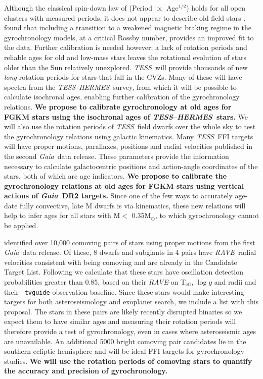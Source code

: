 \documentclass[letterpaper,12pt,preprint]{hack_aastex}
\newcommand{\TESS}{{\it TESS}}
\newcommand{\tess}{{\it TESS}}
\newcommand{\Gaia}{{\it Gaia}}
\newcommand{\RAVE}{{\it RAVE}}
\newcommand{\hermes}{{\it HERMES}}
\newcommand{\HERMES}{{\it HERMES}}
\begin{document}
Although the classical spin-down law of \citet{skumanich1972} (Period
$\propto$ Age$^{1/2}$) holds for all open clusters with measured periods, it
does not appear to describe old field stars \citep{angus2015, van-saders2016}.
\citet{van-saders2016} found that including a transition to a weakened magnetic
braking regime in the gyrochronology models, at a critical Rossby number,
provides an improved fit to the data.
Further calibration is needed however; a lack of rotation periods and reliable
ages for old and low-mass stars leaves the rotational evolution of stars older
than the Sun relatively unexplored.
\TESS\ will provide thousands of new {\it long } rotation periods for stars
that fall in the CVZs.
Many of these will have spectra from the \TESS --\HERMES\ survey, from which
it will be possible to calculate isochronal ages, enabling further calibration
of the gyrochronology relations.
{\bf We propose to calibrate gyrochronology at old ages for FGKM stars using
the isochronal ages of \TESS--\hermes\ stars.}
We will also use the rotation periods of \TESS\ field dwarfs over the whole sky
to test the gyrochronology relations using galactic kinematics.
Many \tess\ FFI targets will have proper motions, parallaxes, positions and
radial velocities published in the second \Gaia\ data release.
These parameters provide the information necessary to calculate galactocentric
positions and action-angle coordinates of the stars, both of which are age
indicators.
{\bf We propose to calibrate the gyrochronology relations at old ages for FGKM
stars using vertical actions of \Gaia\ DR2 targets.}
Since one of the few ways to accurately age-date fully convective, late M
dwarfs is via kinematics, these new relations will help to infer ages for all
stars with M$<$ 0.35M$_\odot$, to which gyrochronology cannot be applied.

\citet{oh2016} identified over 10,000 comoving pairs of stars using proper
motions from the first \Gaia\ data release.
Of these, 8 dwarfs and subgiants in 4 pairs have \RAVE\ radial velocities
consistent with being comoving and are already in the Candidate Target List.
Following \citet{campante2016} we calculate that these stars have oscillation
detection probabilities greater than 0.85, based on their \RAVE-on
T$_{\mathrm{eff}}$, $\log g$ and radii \citep{casey2017} and their {\tt
tvguide} \citep{tvguide} observation baseline.
Since these stars would make interesting targets for both asteroseismology and
exoplanet search, we include a list with this proposal.
The stars in these pairs are likely recently disrupted binaries so we expect
them to have similar ages and measuring their rotation periods
will therefore provide a test of gyrochronology, even in cases where
asteroseismic ages are unavailable.
An additional 5000 bright comoving pair candidates lie in the southern
ecliptic hemisphere and will be ideal FFI targets for gyrochronology studies.
{\bf We will use the rotation periods of comoving stars to quantify the
accuracy and precision of gyrochronology.}
\end{document}
